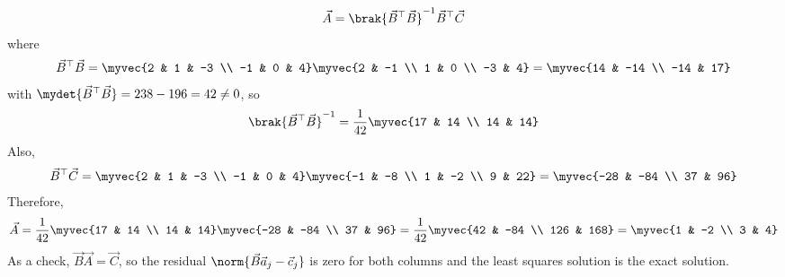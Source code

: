 \begin{enumerate}[label=\thesubsection.\arabic*, ref=\thesubsection.\theenumi]
\begin{align}
	\vec{A} = \brak{\vec{B}^{\top}\vec{B}}^{-1}\vec{B}^{\top}\vec{C}
\end{align}
where
\begin{align}
	\vec{B}^{\top}\vec{B} = \myvec{2 & 1 & -3 \\ -1 & 0 & 4}\myvec{2 & -1 \\ 1 & 0 \\ -3 & 4} = \myvec{14 & -14 \\ -14 & 17}
\end{align}
with $\mydet{\vec{B}^{\top}\vec{B}} = 238 - 196 = 42 \neq 0$, so
\begin{align}
	\brak{\vec{B}^{\top}\vec{B}}^{-1} = \frac{1}{42}\myvec{17 & 14 \\ 14 & 14}
\end{align}
Also,
\begin{align}
	\vec{B}^{\top}\vec{C} = \myvec{2 & 1 & -3 \\ -1 & 0 & 4}\myvec{-1 & -8 \\ 1 & -2 \\ 9 & 22} = \myvec{-28 & -84 \\ 37 & 96}
\end{align}
Therefore,
\begin{align}
	\vec{A} = \frac{1}{42}\myvec{17 & 14 \\ 14 & 14}\myvec{-28 & -84 \\ 37 & 96} = \frac{1}{42}\myvec{42 & -84 \\ 126 & 168}
	= \myvec{1 & -2 \\ 3 & 4}
\end{align}
As a check, $\vec{B}\vec{A} = \vec{C}$, so the residual $\norm{\vec{B}\vec{a}_j - \vec{c}_j}$ is zero for both columns and the least squares solution is the exact solution.


\end{enumerate}
